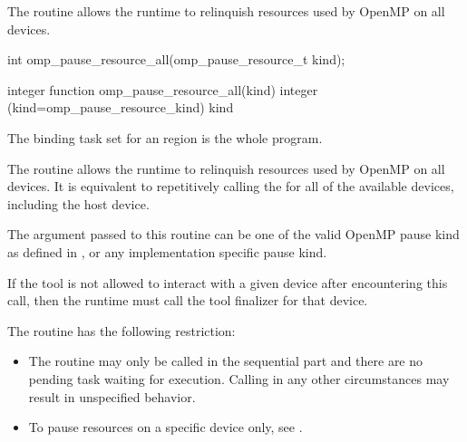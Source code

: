 The  routine allows the runtime to 
relinquish resources used by OpenMP on all devices.

\begin{samepage}
\format
\begin{ccppspecific}
\begin{ompcFunction}
int omp_pause_resource_all(omp_pause_resource_t kind);
\end{ompcFunction}
\end{ccppspecific}
\end{samepage}

\begin{fortranspecific}
\begin{ompfFunction}
integer function omp_pause_resource_all(kind)
integer (kind=omp_pause_resource_kind) kind
\end{ompfFunction}
\end{fortranspecific}

\binding

The binding task set for an  region is the whole program.

\effect

The  routine allows the runtime to relinquish resources 
used by OpenMP on all devices. It is equivalent to repetitively 
calling the  for all of the available devices, including the host device.

The argument  passed to this routine can be one of the valid OpenMP pause kind 
as defined in , or any implementation specific pause kind.

\tools

If the tool is not allowed to interact with a given device after encountering this call, then the runtime must call
the tool finalizer for that device.

\restrictions
The   routine has the following restriction:

\begin{itemize}
\item The routine may only be called in the sequential part and there are no pending task waiting for execution. Calling in any other circumstances may result in unspecified behavior.
\end{itemize}

\crossreferences

\begin{itemize}
\item To pause resources on a specific device only, see
.
\end{itemize}



